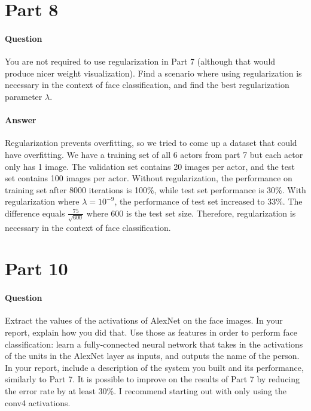 \documentclass[11pt,twoside]{article}
\begin{document}
\clearpage

\section*{Part 8}
\paragraph{Question}
You are not required to use regularization in Part 7 (although that would produce nicer weight visualization). Find a scenario where using regularization is necessary in the context of face classification, and find the best regularization parameter $\lambda$.

\paragraph{Answer}
Regularization prevents overfitting, so we tried to come up a dataset that could have overfitting. We have a training set of all 6 actors from part 7 but each actor only has 1 image. The validation set contains 20 images per actor, and the test set contains 100 images per actor. Without regularization, the performance on training set after 8000 iterations is 100\%, while test set performance is 30\%. With regularization where $\lambda = 10^{-9}$, the performance of test set increased to 33\%. The difference equals $\frac{75}{\sqrt{600}}$ where 600 is the test set size. Therefore, regularization is necessary in the context of face classification.

\clearpage

\section*{Part 10}
\paragraph{Question}
Extract the values of the activations of AlexNet on the face images. In your report, explain how you did that. Use those as features in order to perform face classification: learn a fully-connected neural network that takes in the activations of the units in the AlexNet layer as inputs, and outputs the name of the person. In your report, include a description of the system you built and its performance, similarly to Part 7. It is possible to improve on the results of Part 7 by reducing the error rate by at least 30\%. I recommend starting out with only using the conv4 activations.
\end{document}
